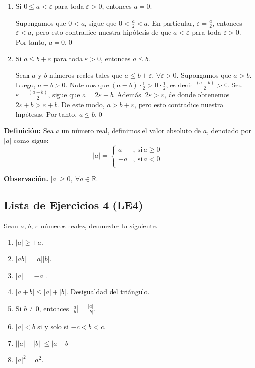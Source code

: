 \documentclass[11pt]{article}
\newcommand{\R}{\mathbb{R}}
\let\epsilon\varepsilon
\let\set\Set
\begin{document}
\begin{enumerate}[label=\alph*)]
    \item Si $0 \leq a < \varepsilon$ para toda $\varepsilon > 0$, entonces $a=0$.
    
    Supongamos que $0<a$, sigue que $0<\frac{a}{2}<a$. En particular, $\epsilon=\frac{a}{2}$, entonces $\varepsilon<a$, pero esto contradice nuestra hipótesis de que $a< \varepsilon$ para toda $\varepsilon>0$. Por tanto, $a=0$.\qed

    \item Si $a \leq b + \varepsilon$ para toda $\varepsilon > 0$, entonces $a \leq b$.
    
    Sean $a$ y $b$ números reales tales que $a \leq b + \varepsilon$, $\forall \varepsilon > 0$. Supongamos que $a > b$. Luego, $a-b>0$. Notemos que $(a-b) \cdot \frac{1}{2} > 0 \cdot \frac{1}{2}$, es decir $\frac{(a-b)}{2} > 0$. Sea $\varepsilon = \frac{(a-b)}{2}$, sigue que $a=2\varepsilon+b$. Además, $2\varepsilon > \varepsilon$, de donde obtenemos $2 \varepsilon + b > \varepsilon + b$. De este modo, $a > b+\varepsilon$, pero esto contradice nuestra hipótesis. Por tanto, $a \leq b$.\qed

\end{enumerate}

%
\textbf{Definición:} Sea $a$ un número real, definimos el valor absoluto de $a$, denotado por $|a|$ como sigue: 
    \[
    |a| = 
    \left \{
        \begin{aligned}
        a &,\ \text{si} \ a \geq 0\\
        -a &,\ \text{si} \ a < 0 \\
        \end{aligned}
    \right .
    \]

\textbf{Observación.} $|a|\geq 0, \ \forall a\in \R$.

\subsection*{Lista de Ejercicios 4 (LE4)}

Sean $a$, $b$, $c$ números reales, demuestre lo siguiente:

\begin{enumerate}[label=\alph*)]
    \item $|a| \geq \pm a$. %
    \item $|ab|=|a||b|$. %
    \item $|a|=|-a|$. %
    \item $|a+b|\leq |a|+|b|$. Desigualdad del triángulo. %
    \item Si $b\neq 0$, entonces $\left| \frac{a}{b} \right| = \frac{|a|}{|b|}$. %
    \item $|a|<b$ si y solo si $-c<b<c$. %
    \item $ \big| |a|-|b| \big| \leq |a-b|$ %
    \item $|a|^2=a^2$.
\end{enumerate}
\end{document}

